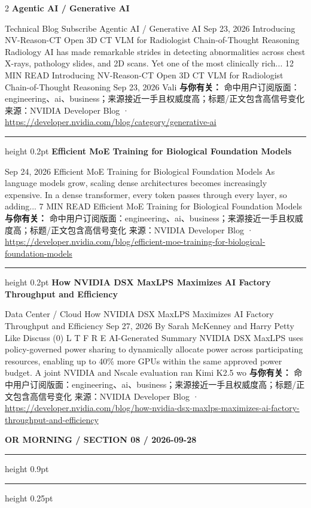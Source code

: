 \documentclass[10.5pt]{ctexart}
\begin{document}
\begin{multicols}{2}
{\large\bfseries Agentic AI / Generative AI}\par
Technical Blog Subscribe Agentic AI / Generative AI Sep 23, 2026 Introducing NV-Reason-CT Open 3D CT VLM for Radiologist Chain-of-Thought Reasoning Radiology AI has made remarkable strides in detecting abnormalities across chest X-rays, pathology slides, and 2D scans. Yet one of the most clinically rich... 12 MIN READ Introducing NV-Reason-CT Open 3D CT VLM for Radiologist Chain-of-Thought Reasoning Sep 23, 2026 Vali
\textbf{与你有关：} 命中用户订阅版面：engineering、ai、business；来源接近一手且权威度高；标题/正文包含高信号变化
{\footnotesize\color{ormuted} 来源：NVIDIA Developer Blog · \url{https://developer.nvidia.com/blog/category/generative-ai}}
\vspace{2mm}
\hrule height 0.2pt
\vspace{2mm}
{\large\bfseries Efficient MoE Training for Biological Foundation Models}\par
Sep 24, 2026 Efficient MoE Training for Biological Foundation Models As language models grow, scaling dense architectures becomes increasingly expensive. In a dense transformer, every token passes through every layer, so adding... 7 MIN READ Efficient MoE Training for Biological Foundation Models
\textbf{与你有关：} 命中用户订阅版面：engineering、ai、business；来源接近一手且权威度高；标题/正文包含高信号变化
{\footnotesize\color{ormuted} 来源：NVIDIA Developer Blog · \url{https://developer.nvidia.com/blog/efficient-moe-training-for-biological-foundation-models}}
\vspace{2mm}
\hrule height 0.2pt
\vspace{2mm}
{\large\bfseries How NVIDIA DSX MaxLPS Maximizes AI Factory Throughput and Efficiency}\par
Data Center / Cloud How NVIDIA DSX MaxLPS Maximizes AI Factory Throughput and Efficiency Sep 27, 2026 By Sarah McKenney and Harry Petty Like Discuss (0) L T F R E AI-Generated Summary NVIDIA DSX MaxLPS uses policy-governed power sharing to dynamically allocate power across participating resources, enabling up to 40\% more GPUs within the same approved power budget. A joint NVIDIA and Nscale evaluation ran Kimi K2.5 wo
\textbf{与你有关：} 命中用户订阅版面：engineering、ai、business；来源接近一手且权威度高；标题/正文包含高信号变化
{\footnotesize\color{ormuted} 来源：NVIDIA Developer Blog · \url{https://developer.nvidia.com/blog/how-nvidia-dsx-maxlps-maximizes-ai-factory-throughput-and-efficiency}}
\end{multicols}
\newpage
{\small\bfseries OR MORNING / SECTION 08 / 2026-09-28}
\vspace{2mm}
\hrule height 0.9pt
\vspace{1.5mm}
\hrule height 0.25pt
\vspace{4mm}
\end{document}
